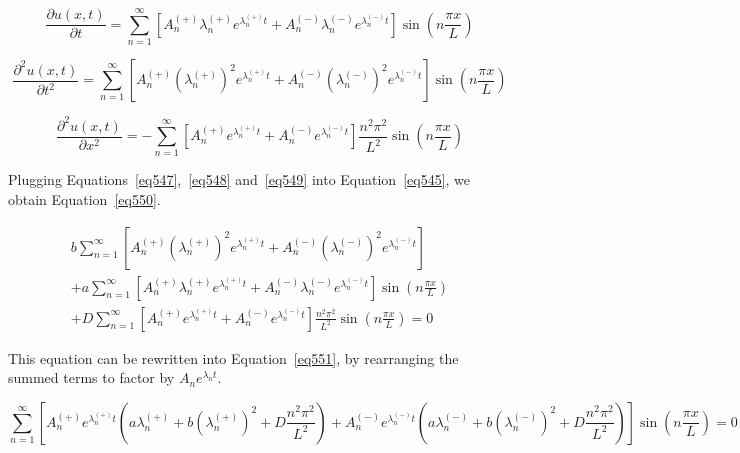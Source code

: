 \begin{equation}\label{eq547}
\frac{\partial u(x,t)}{\partial t} = \sum_{n=1}^{\infty} \left[ A_n^{(+)}\lambda_n^{(+)}e^{\lambda_n^{(+)}t} + A_n^{(-)}\lambda_n^{(-)}e^{\lambda_n^{(-)}t} \right] \sin \left( n\frac{\pi x}{L} \right)
\end{equation}

\begin{equation}\label{eq548}
\frac{\partial^2 u(x,t)}{\partial t^2} = \sum_{n=1}^{\infty} \left[ A_n^{(+)} \left( \lambda_n^{(+)} \right)^2 e^{\lambda_n^{(+)}t} + A_n^{(-)} \left( \lambda_n^{(-)} \right)^2 e^{\lambda_n^{(-)}t} \right] \sin \left( n\frac{\pi x}{L} \right)
\end{equation}

\begin{equation}\label{eq549}
\frac{\partial^2 u(x,t)}{\partial x^2} = - \sum_{n=1}^{\infty} \left[ A_n^{(+)}e^{\lambda_n^{(+)}t} + A_n^{(-)}e^{\lambda_n^{(-)}t} \right] \frac{n^2\pi^2}{L^2} \sin \left( n\frac{\pi x}{L} \right)
\end{equation}

Plugging Equations~\ref{eq547},~\ref{eq548} and~\ref{eq549} into Equation~\ref{eq545}, we obtain Equation~\ref{eq550}.

\begin{equation}\label{eq550}
\begin{split}
b\sum_{n=1}^{\infty} \left[ A_n^{(+)} \left( \lambda_n^{(+)} \right)^2 e^{\lambda_n^{(+)}t} + A_n^{(-)} \left( \lambda_n^{(-)} \right)^2 e^{\lambda_n^{(-)}t} \right] \\ + a\sum_{n=1}^{\infty} \left[ A_n^{(+)}\lambda_n^{(+)}e^{\lambda_n^{(+)}t} + A_n^{(-)}\lambda_n^{(-)}e^{\lambda_n^{(-)}t} \right] \sin \left( n\frac{\pi x}{L} \right) \\ + D\sum_{n=1}^{\infty} \left[ A_n^{(+)}e^{\lambda_n^{(+)}t} + A_n^{(-)}e^{\lambda_n^{(-)}t} \right] \frac{n^2\pi^2}{L^2} \sin \left( n\frac{\pi x}{L} \right) = 0
\end{split}
\end{equation}

This equation can be rewritten into Equation~\ref{eq551}, by rearranging the summed terms to factor by $A_ne^{\lambda_n t}$.

\begin{equation}\label{eq551}
\sum_{n=1}^{\infty} \left[ A_n^{(+)}e^{\lambda_n^{(+)}t} \left( a\lambda_n^{(+)} + b\left( \lambda_n^{(+)} \right)^2 + D\frac{n^2\pi^2}{L^2}  \right)  +  A_n^{(-)}e^{\lambda_n^{(-)}t} \left( a\lambda_n^{(-)} + b\left( \lambda_n^{(-)} \right)^2 + D\frac{n^2\pi^2}{L^2}  \right)        \right] \sin \left( n\frac{\pi x}{L} \right) = 0
\end{equation}

